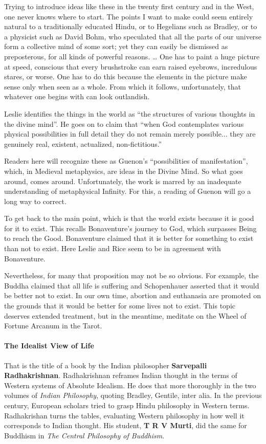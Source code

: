 \begin{quotex}
Trying to introduce ideas like these in the twenty first century and in the West, one never knows where to start. The
points I want to make could seem entirely natural to a traditionally educated Hindu, or to Hegelians such as Bradley,
or to a physicist such as David Bohm, who speculated that all the parts of our universe form a collective mind of some
sort; yet they can easily be dismissed as preposterous, for all kinds of powerful reasons. … One has to paint a huge
picture at speed, conscious that every brushstroke can earn raised eyebrows, incredulous stares, or worse. One has to
do this because the elements in the picture make sense only when seen as a whole. From which it follows, unfortunately,
that whatever one begins with can look outlandish. 

\end{quotex}

Leslie identifies the things in the world as “the structures of various thoughts in the divine mind”. He goes on to
claim that “when God contemplates various physical possibilities in full detail they do not remain merely possible...
they are genuinely real, existent, actualized, non-fictitious.”

Readers here will recognize these as Guenon's “possibilities of manifestation”, which, in Medieval
metaphysics, are ideas in the Divine Mind. So what goes around, comes around. Unfortunately, the work is marred by an
inadequate understanding of metaphysical Infinity. For this, a reading of Guenon will go a long way to correct.

To get back to the main point, which is that the world exists because it is good for it to exist. This recalls
Bonaventure's journey to God, which surpasses Being to reach the Good. Bonaventure claimed that it is
better for something to exist than not to exist. Here Leslie and Rice seem to be in agreement with Bonaventure.

Nevertheless, for many that proposition may not be so obvious. For example, the Buddha claimed that all life is
suffering and Schopenhauer asserted that it would be better not to exist. In our own time, abortion and euthanasia are
promoted on the grounds that it would be better for some lives not to exist. This topic deserves extended treatment,
but in the meantime, meditate on the Wheel of Fortune Arcanum in the Tarot.

\paragraph{The Idealist View of Life}
That is the title of a book by the Indian philosopher \textbf{Sarvepalli Radhakrishnan}. Radhakrishnan reframes Indian
thought in the terms of Western systems of Absolute Idealism. He does that more thoroughly in the two volumes of
\emph{Indian Philosophy}, quoting Bradley, Gentile, inter alia. In the previous century, European scholars tried to
grasp Hindu philosophy in Western terms. Radhakrishan turns the tables, evaluating Western philosophy in how well it
corresponds to Indian thought. His student, \textbf{T R V Murti}, did the same for Buddhism in \emph{The Central
Philosophy of Buddhism}.

